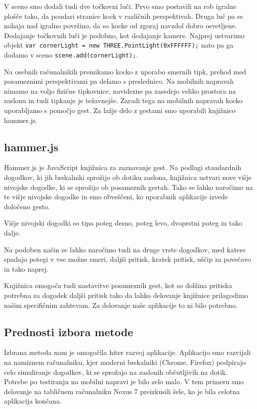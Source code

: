 V sceno smo dodali tudi dve točkovni luči. Prvo smo postavili na rob igralne plošče tako, da poudari stranice kock v različnih perspektivah. Druga luč pa se nahaja nad igralno površino, da so kocke od zgoraj navzdol dobro osvetljene. Dodajanje točkovnih luči je podobno, kot dodajanje kamere. Najprej ustvarimo objekt \texttt{var cornerLight =  new THREE.PointLight(0xFFFFFF);} nato pa ga dodamo v sceno \texttt{scene.add(cornerLight);}.

Na osebnih računalnikih premikamo kocko z uporabo smernih tipk, prehod med posameznimi perspektivami pa delamo s preslednico. Na mobilnih napravah nimamo na voljo fizične tipkovnice, navidezne pa zasedejo veliko prostora na zaslonu in tudi tipkanje je težavnejše. Zaradi tega na mobilnih napravah kocko uporabljamo s pomočjo gest. Za lažje delo z gestami smo uporabili knjižnico hammer.js.

\subsection{hammer.js}

Hammer.js je JavaScript knjižnica za zaznavanje gest. Na podlagi standardnih dogodkov, ki jih brskalniki sprožijo ob dotiku zaslona, knjižnica ustvari nove višje nivojske dogodke, ki se sprožijo ob posameznih gestah. Tako se lahko naročimo na te višje nivojske dogodke in smo obveščeni, ko uporabnik aplikacije izvede določeno gesto.

Višje nivojski dogodki so tipa poteg desno, poteg levo, dvoprstni poteg in tako dalje. 

Na podoben način se lahko naročimo tudi na druge vrste dogodkov, med katere spadajo potegi v vse možne smeri, daljši pritisk, kratek pritisk, uščip za povečavo in tako naprej.

Knjižnica omogoča tudi nastavitve posameznih gest, kot so dolžina pritiska potrebna za dogodek daljši pritisk tako da lahko delovanje knjižnice prilagodimo našim specifičnim zahtevam. Za delovanje naše aplikacije to ni bilo potrebno.

\subsection{Prednosti izbora metode}

Izbrana metoda nam je omogočila hiter razvoj aplikacije. Aplikacijo smo razvijali na namiznem računalniku, kjer moderni brskalniki (Chrome, Firefox) podpirajo celo simuliranje dogodkov, ki se sprožajo na zaslonih občutljivih na dotik. Potrebe po testiranju na mobilni napravi je bilo zelo malo. V tem primeru smo delovanje na tabličnem računalniku Nexus 7 preizkusili šele, ko je bila celotna aplikacija končana.

